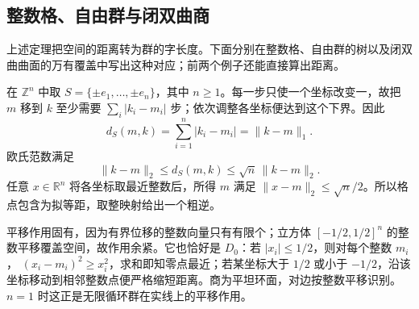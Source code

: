 \subsection{整数格、自由群与闭双曲商}
\label{g3:subsec:D01:05}

上述定理把空间的距离转为群的字长度。下面分别在整数格、自由群的树以及闭双曲曲面的万有覆盖中写出这种对应；前两个例子还能直接算出距离。

\begin{example}\label{g3:exm:D-integer-lattice}
	在 \(\mathbb Z^n\) 中取 \(S=\{\pm e_1,\ldots,\pm e_n\}\)，其中 \(n\ge1\)。每一步只使一个坐标改变一，故把 \(m\) 移到 \(k\) 至少需要 \(\sum_i|k_i-m_i|\) 步；依次调整各坐标便达到这个下界。因此
	\[
		d_S(m,k)=\sum_{i=1}^n|k_i-m_i|=\|k-m\|_1.
	\]
	欧氏范数满足
	\[
		\|k-m\|_2\le d_S(m,k)\le\sqrt n\,\|k-m\|_2.
	\]
	任意 \(x\in\mathbb R^n\) 将各坐标取最近整数后，所得 \(m\) 满足
	\(\|x-m\|_2\le\sqrt n/2\)。所以格点包含为拟等距，取整映射给出一个粗逆。

	平移作用固有，因为有界位移的整数向量只有有限个；立方体 \([-1/2,1/2]^n\) 的整数平移覆盖空间，故作用余紧。它也恰好是 \(D_0\)：若 \(|x_i|\le1/2\)，则对每个整数 \(m_i\)，
	\((x_i-m_i)^2\ge x_i^2\)，求和即知零点最近；若某坐标大于 \(1/2\) 或小于 \(-1/2\)，沿该坐标移动到相邻整数点便严格缩短距离。商为平坦环面，对边按整数平移识别。\(n=1\) 时这正是无限循环群在实线上的平移作用。
\end{example}

